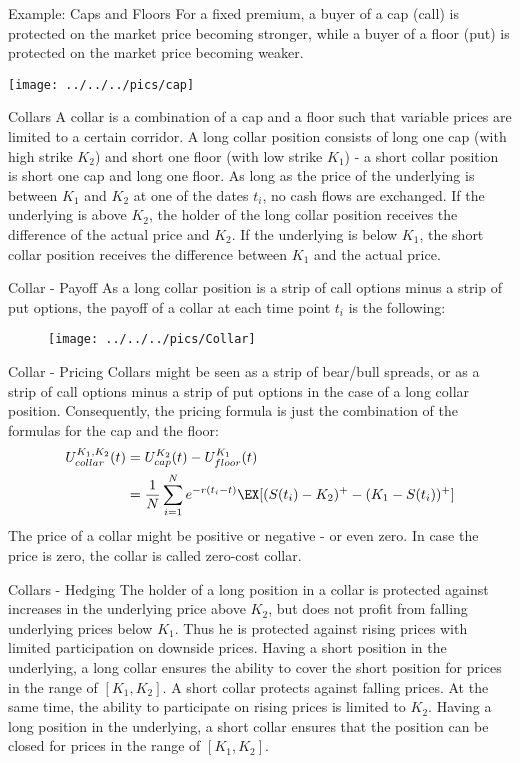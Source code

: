 Example: Caps and Floors
For a fixed premium, a buyer of a cap (call) is protected on the market price becoming stronger, while a buyer of a floor (put) is protected on the market price becoming weaker.\\
\begin{center}
\texttt{[image: ../../../pics/cap]}
\end{center}


Collars
A collar is a combination of a cap and a floor such that variable prices are limited to a certain corridor. A long collar position consists of long one cap (with high strike $K_2$) and short one floor (with low strike $K_1$) - a short collar position is short one cap and long one floor. As long as the price of the underlying is between $K_1$ and $K_2$ at one of the dates $t_i$, no cash flows are exchanged. If the underlying is above $K_2$, the holder of the long collar position receives the difference of the actual price and $K_2$. If the underlying is below $K_1$, the short collar position receives the difference between $K_1$ and the actual price.


Collar - Payoff
As a long collar position is a strip of call options minus a strip of put options, the payoff of a collar at each time point $t_i$ is the following:
\begin{figure}
	\centering
		\texttt{[image: ../../../pics/Collar]}
	\label{fig:Collar}
\end{figure}


Collar - Pricing
Collars might be seen as a strip of bear/bull spreads, or as a strip of call options minus a strip of put options in the case of a long collar position. Consequently, the pricing formula is just the combination of the formulas for the cap and the floor:
\begin{align*}
	U^{K_1, K_2}_{collar}(t)&=U^{K_2}_{cap}(t)-U^{K_1}_{floor}(t)\\
	&=\frac{1}{N}\sum_{i=1}^Ne^{-r(t_i-t)}\EX[(S(t_i)-K_2)^+ - (K_1-S(t_i))^+]
\end{align*}
The price of a collar might be positive or negative - or even zero. In case the price is zero, the collar is called zero-cost collar.


Collars - Hedging
The holder of a long position in a collar is protected against increases in the underlying price above $K_2$, but does not profit from falling underlying prices below $K_1$. Thus he is protected against rising prices with limited participation on downside prices. Having a short position in the underlying, a long collar ensures the ability to cover the short position for prices in the range of $[K_1, K_2]$.
A short collar protects against falling prices. At the same time, the ability to participate on rising prices is limited to $K_2$. Having a long position in the underlying, a short collar ensures that the position can be closed for prices in the range of $[K_1, K_2]$.


